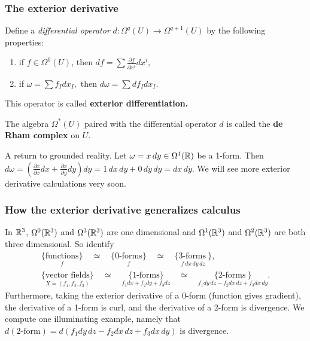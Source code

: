 \documentclass[xcolor=dvipsnames]{beamer}
\begin{document}
    \begin{frame}
        \frametitle{The exterior derivative} 
        \begin{definition}[]
            Define a \emph{differential operator} $d \colon \Omega^q(U) \to \Omega^{q+1} (U)$ by the following properties:
            \begin{enumerate}[i]
            \setlength\itemsep{0.2em}
        \item if $f \in \Omega^0(U)$, then $df=\sum \frac{\partial f}{\partial x^i }dx^i $,
        \item if $\omega =\sum f_I dx_I,$ then $d\omega=\sum df_Idx_I$.
            \end{enumerate}
            This operator is called \textbf{exterior differentiation.} 
        \end{definition}
        \begin{definition}[]
            The algebra $\Omega^*\left(U \right)$ paired with the differential operator $d$ is called the \textbf{de Rham complex} on $U$.
        \end{definition}%
\begin{example}
    A return to grounded reality. Let $\omega=x\,dy \in \Omega^1(\mathbb{R})$ be a 1-form. Then $d \omega = \left( \frac{\partial x}{\partial x}dx+ \frac{\partial x}{\partial y}dy \right) dy=1\,dx\,dy+0 \,dy\,dy=dx\,dy.$ We will see more exterior derivative calculations very soon.
\end{example}
    \end{frame}

    \begin{frame}
        \frametitle{How the exterior derivative generalizes calculus} 
        In $\mathbb{R}^3$, $\Omega^0(\mathbb{R}^3)$ and $\Omega^3(\mathbb{R}^3)$ are one dimensional and $\Omega^1(\mathbb{R}^3)$ and $\Omega^2(\mathbb{R}^3)$ are both three dimensional. So identify
            \begin{gather*}
   \underset{f}{ \{\text{functions} \} } \quad \simeq \quad \underset{f}{\{0\text{-forms} \}}  \quad \simeq \quad \underset{f\,dx\,dy\,dz}{\{3\text{-forms} \ \} 
}  ,   \\
\underset{X=(f_1,f_2,f_3)}{ \{\text{vector fields} \} } \quad \simeq \quad \underset{f_1dx+f_2dy+f_3dz}{\{1\text{-forms} \}}  \quad \simeq \quad \underset{f_1dy\,dz-f_2dx\,dz+f_3dx\,dy}{\{2\text{-forms} \ \} 
}  .
    \end{gather*}Furthermore, taking the exterior derivative of a 0-form (function gives gradient), the derivative of a 1-form is curl, and the derivative of a 2-form is divergence. We compute one illuminating example, namely that $d(2\text{-form} )=d(f_1dy\,dz-f_2dx\,dz+f_3dx\,dy)$ is divergence.
    \end{frame}
\end{document}
